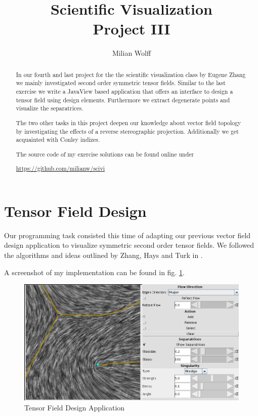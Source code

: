 \documentclass[a4paper,10pt,notitlepage]{scrartcl}
\title{Scientific Visualization\\Project III}
\author{Milian Wolff}
\begin{document}
\maketitle

\begin{abstract}
In our fourth and last project for the the scientific visualization class
by Eugene Zhang we mainly investigated second order symmetric tensor fields.
Similar to the last exercise we write a JavaView based application that offers
an interface to design a tensor field using design elements. Furthermore we
extract degenerate points and visualize the separatrices.

The two other tasks in this project deepen our knowledge about vector field
topology by investigating the effects of a reverse stereographic projection.
Additionally we get acquainted with Conley indizes.

The source code of my exercise solutions can be found online under

\begin{center}\url{https://github.com/milianw/scivi}\end{center}
\end{abstract}

\begingroup
\let\clearpage\relax

\tableofcontents
\endgroup

\section{Tensor Field Design}

Our programming task consisted this time of adapting our previous vector field
design application to visualize symmetric second order tensor fields. We
followed the algorithms and ideas outlined by Zhang, Hays and Turk in
\cite{tfd}.

A screenshot of my implementation can be found in fig. \ref{fig:tfd-app}.

\begin{figure}
 \centering
 \includegraphics[scale=0.5]{img-4-2/app.png}
 \caption{Tensor Field Design Application}
 \label{fig:tfd-app}
\end{figure}
\end{document}
